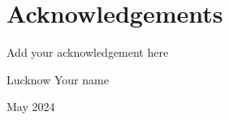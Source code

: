 \chapter*{Acknowledgements}


Add your acknowledgement here

\vspace{3cm}

\noindent Lucknow \hfill Your name

\noindent May 2024

